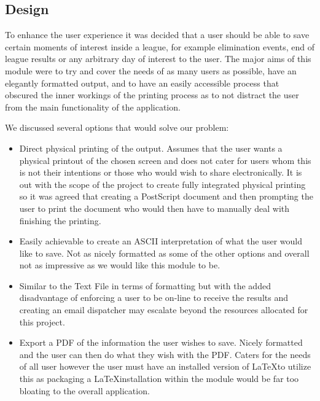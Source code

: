 \subsection{Design}

To enhance the user experience it was decided that a user should be
able to save certain moments of interest inside a league, for example
elimination events, end of league results or any arbitrary day of
interest to the user. The major aims of this module were to try and
cover the needs of as many users as possible, have an elegantly
formatted output, and to have an easily accessible process that
obscured the inner workings of the printing process as to not distract
the user from the main functionality of the application.

We discussed several options that would solve our problem:

\begin{itemize}
  \item[Physical Printing] Direct physical printing of the
    output. Assumes that the user wants a physical printout of the
    chosen screen and does not cater for users whom this is not their
    intentions or those who would wish to share electronically. It is
    out with the scope of the project to create fully integrated
    physical printing so it was agreed that creating a PostScript
    document and then prompting the user to print the document who
    would then have to manually deal with finishing the printing.
  \item[Text File] Easily achievable to create an ASCII interpretation
    of what the user would like to save. Not as nicely formatted as
    some of the other options and overall not as impressive as we
    would like this module to be.
  \item[Emailed results] Similar to the Text File in terms of
    formatting but with the added disadvantage of enforcing a user to
    be on-line to receive the results and creating an email dispatcher
    may escalate beyond the resources allocated for this project.
  \item[\LaTeX] Export a PDF of the information the user wishes to
    save. Nicely formatted and the user can then do what they wish
    with the PDF. Caters for the needs of all user however the user
    must have an installed version of \LaTeX to utilize this as
    packaging a \LaTeX installation within the module would be far too
    bloating to the overall application.
\end{itemize}

